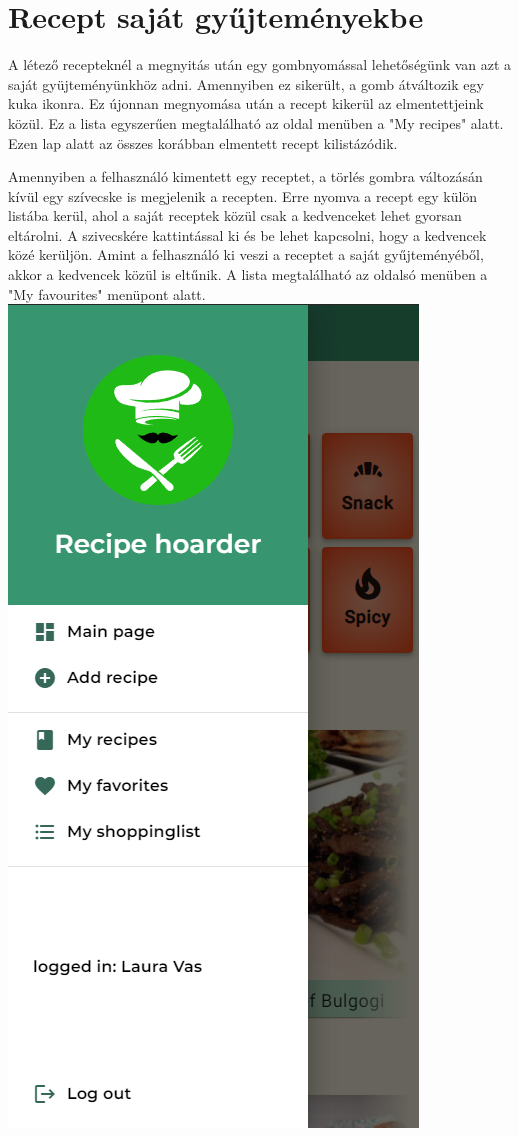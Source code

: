 \documentclass[12pt]{report}
\theoremstyle{definition}
\begin{document}
\section{Recept saját gyűjteményekbe}
A létező recepteknél a megnyitás után egy gombnyomással lehetőségünk van azt a saját gyüjteményünkhöz adni. Amennyiben ez sikerült, a gomb átváltozik egy kuka ikonra. Ez újonnan megnyomása után a recept kikerül az elmentettjeink közül. Ez a lista egyszerűen megtalálható az oldal menüben a "My recipes" alatt. Ezen lap alatt az összes korábban elmentett recept kilistázódik.

Amennyiben a felhasználó kimentett egy receptet, a törlés gombra változásán kívül egy szívecske is megjelenik a recepten. Erre nyomva a recept egy külön listába kerül, ahol a saját receptek közül csak a kedvenceket lehet gyorsan eltárolni. A szivecskére kattintással ki és be lehet kapcsolni, hogy a kedvencek közé kerüljön. Amint a felhasználó ki veszi a receptet a saját gyűjteményéből, akkor a kedvencek közül is eltűnik. A lista megtalálható az oldalsó menüben a "My favourites" menüpont alatt.
\noindent
\includegraphics[scale=0.5]{pictures/mobil_menu.png}
\end{document}
